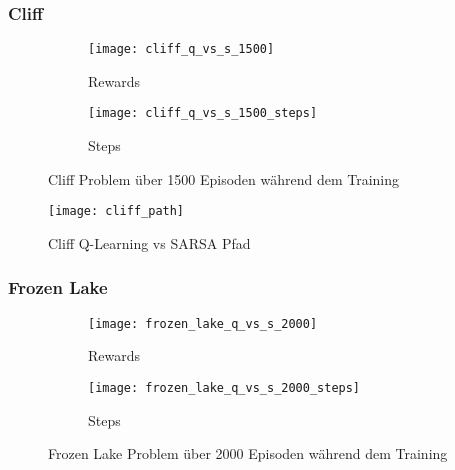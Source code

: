 \subsubsection{Cliff}
\begin{figure}[H]
    \centering
    \begin{subfigure}{.5\textwidth}
      \centering
      \texttt{[image: cliff\_q\_vs\_s\_1500]}
      \caption{Rewards}
      \label{fig:cliff_rew}
    \end{subfigure}%
    \begin{subfigure}{.5\textwidth}
      \centering
      \texttt{[image: cliff\_q\_vs\_s\_1500\_steps]}
      \caption{Steps}
      \label{fig:cliff_step}
    \end{subfigure}
    \caption{Cliff Problem über 1500 Episoden während dem Training}
    \label{fig:cliff_train}
\end{figure}

\begin{figure}[H]
    \texttt{[image: cliff\_path]}
    \caption{Cliff Q-Learning vs SARSA Pfad}
    \label{fig:cliff_path}
\end{figure}

\subsubsection{Frozen Lake}

\begin{figure}[H]
    \centering
    \begin{subfigure}{.5\textwidth}
      \centering
      \texttt{[image: frozen\_lake\_q\_vs\_s\_2000]}
      \caption{Rewards}
      \label{fig:frozen_rew}
    \end{subfigure}%
    \begin{subfigure}{.5\textwidth}
      \centering
      \texttt{[image: frozen\_lake\_q\_vs\_s\_2000\_steps]}
      \caption{Steps}
      \label{fig:frozen_step}
    \end{subfigure}
    \caption{Frozen Lake Problem über 2000 Episoden während dem Training}
    \label{fig:frozen_train}
\end{figure}

